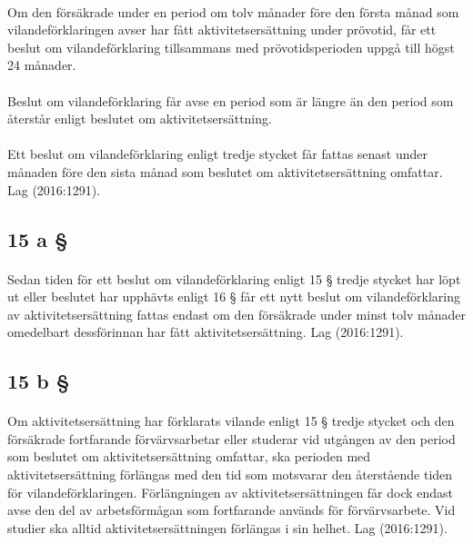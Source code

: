 \documentclass[a4paper,notitlepage,openany,10pt]{book}
\begin{document}
\paragraph*{}
Om den försäkrade under en period om tolv månader före den första månad som vilandeförklaringen avser har fått aktivitetsersättning under prövotid, får ett beslut om vilandeförklaring tillsammans med prövotidsperioden uppgå till högst 24 månader.
\paragraph*{}
Beslut om vilandeförklaring får avse en period som är längre än den period som återstår enligt beslutet om aktivitetsersättning.
\paragraph*{}
Ett beslut om vilandeförklaring enligt tredje stycket får fattas senast under månaden före den sista månad som beslutet om aktivitetsersättning omfattar.
Lag (2016:1291).
\subsection*{15 a §}
\paragraph*{}
Sedan tiden för ett beslut om vilandeförklaring enligt 15 § tredje stycket har löpt ut eller beslutet har upphävts enligt 16 § får ett nytt beslut om vilandeförklaring av aktivitetsersättning fattas endast om den försäkrade under minst tolv månader omedelbart dessförinnan har fått aktivitetsersättning.
Lag (2016:1291).
\subsection*{15 b §}
\paragraph*{}
Om aktivitetsersättning har förklarats vilande enligt 15 § tredje stycket och den försäkrade fortfarande förvärvsarbetar eller studerar vid utgången av den period som beslutet om aktivitetsersättning omfattar, ska perioden med aktivitetsersättning förlängas med den tid som motsvarar den återstående tiden för vilandeförklaringen. Förlängningen av aktivitetsersättningen får dock endast avse den del av arbetsförmågan som fortfarande används för förvärvsarbete. Vid studier ska alltid aktivitetsersättningen förlängas i sin helhet.
Lag (2016:1291).
\end{document}
